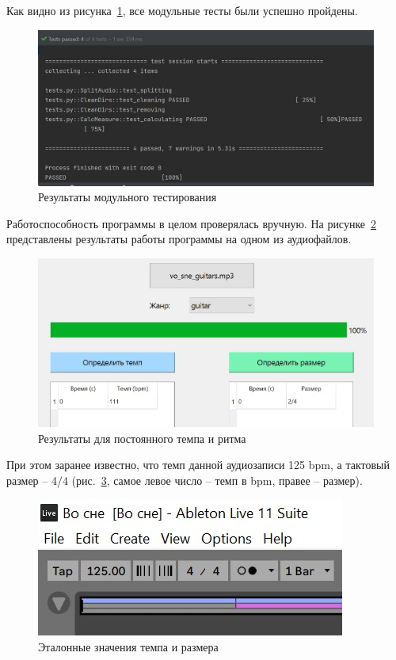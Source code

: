 Как видно из рисунка~\ref{img:units}, все модульные тесты были успешно пройдены.

\begin{figure}[h]
	\centering
	\includegraphics[scale=0.8]{inc/img/units.jpg}
	\caption{Результаты модульного тестирования}
	\label{img:units}
\end{figure}

\newpage

Работоспособность программы в целом проверялась вручную. На рисунке~\ref{img:test_const} представлены результаты работы программы на одном из аудиофайлов.

\begin{figure}[h]
	\centering
	\includegraphics[scale=0.9]{inc/img/test_constant.jpg}
	\caption{Результаты для постоянного темпа и ритма}
	\label{img:test_const}
\end{figure}

\newpage

При этом заранее известно, что темп данной аудиозаписи 125 bpm, а тактовый размер -- 4/4 (рис.~\ref{img:vosne_ref}, самое левое число -- темп в bpm, правее -- размер).

\begin{figure}[h]
	\centering
	\includegraphics[scale=1.4]{inc/img/vosne_ref.jpg}
	\caption{Эталонные значения темпа и размера}
	\label{img:vosne_ref}
\end{figure}

